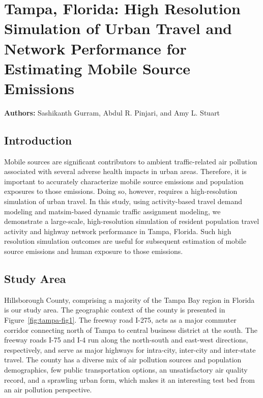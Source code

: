 \chapter{Tampa, Florida: High Resolution Simulation of Urban Travel and Network Performance for Estimating Mobile Source Emissions}
\label{ch:tampa}
\hfill \textbf{Authors:} Sashikanth Gurram, Abdul R. Pinjari, and Amy L. Stuart

\section{Introduction}
Mobile sources are significant contributors to ambient traffic-related air pollution associated with several adverse health impacts in urban areas. Therefore, it is important to accurately characterize mobile source emissions and population exposures to those emissions. Doing so, however, requires a high-resolution simulation of urban travel. In this study, using activity-based travel demand modeling and \gls{matsim}-based dynamic traffic assignment modeling, we demonstrate a large-scale, high-resolution simulation of resident population travel activity and highway network performance in Tampa, Florida. Such high resolution simulation outcomes are useful for subsequent estimation of mobile source emissions and human exposure to those emissions. 

\section{Study Area}
Hillsborough County, comprising a majority of the Tampa Bay region in Florida is our study area. The geographic context of the county is presented in Figure~\ref{fig:tampa-fig1}. The freeway road I-275, acts as a major commuter corridor connecting north of Tampa to central business district at the south. The freeway roads I-75 and I-4 run along the north-south and east-west directions, respectively, and serve as major highways for intra-city, inter-city and inter-state travel. The county has a diverse mix of air pollution sources and population demographics, few public transportation options, an unsatisfactory air quality record, and a sprawling urban form, which makes it an interesting test bed from an air pollution perspective.

